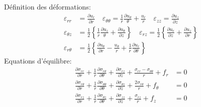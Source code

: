 Définition des déformations:
\begin{align*}
    \varepsilon_{rr} &= \frac{\partial u_r}{\partial r} \quad \varepsilon_{\theta\theta} = \frac{1}{r} \frac{\partial u_{\theta}}{\theta} + \frac{u_r}{r} \quad \varepsilon_{zz} = \frac{\partial u_z}{\partial z} \\[3pt]
    \varepsilon_{\theta z} &= \frac{1}{2} \left\{ \frac{1}{r} \frac{\partial u_z}{\theta} + \frac{\partial u_{\theta}}{\partial z} \right\} \quad \varepsilon_{rz} = \frac{1}{2} \left\{ \frac{\partial u_r}{\partial z} + \frac{\partial u_z}{\partial r} \right\} \\[3pt]
    \varepsilon_{r\theta} &= \frac{1}{2} \left\{ \frac{\partial u_{\theta}}{\partial r} - \frac{u_{\theta}}{r} + \frac{1}{r} \frac{\partial u_r}{\partial \theta} \right\}
\end{align*}
Equations d'équilibre:
\begin{align*}
    \frac{\partial \sigma_{rr}}{\partial r} + \frac{1}{r} \frac{\partial \sigma_{r\theta}}{\partial \theta} + \frac{\partial \sigma_{rz}}{\partial z} + \frac{\sigma_{rr} - \sigma_{\theta\theta}}{r} + f_r &=0\\[3pt]
    \frac{\partial \sigma_{r\theta}}{\partial r} + \frac{1}{r} \frac{\partial \sigma_{\theta\theta}}{\partial \theta} + \frac{\partial \sigma_{\theta z}}{\partial z} + \frac{2\sigma_{r\theta}}{r} + f_{\theta} &=0\\[3pt]
    \frac{\partial \sigma_{rz}}{\partial r} + \frac{1}{r} \frac{\partial \sigma_{\theta z}}{\partial \theta} + \frac{\partial \sigma_{zz}}{\partial z} + \frac{\sigma_{rz}}{r} + f_z &=0
\end{align*}
